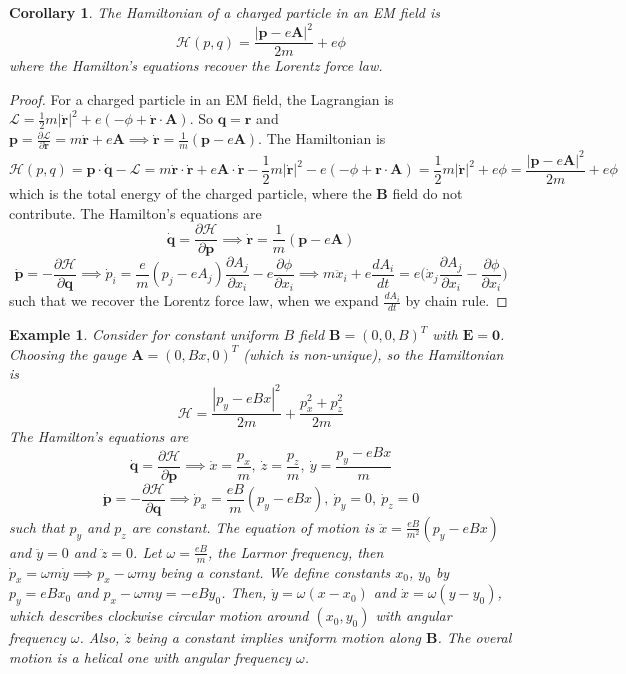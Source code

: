 \documentclass[a4paper]{article}
\newtheorem{eg}{Example}[section]
\theoremstyle{new}
\newtheorem{cor}{Corollary}[section]
\begin{document}
\begin{cor}
The Hamiltonian of a charged particle in an EM field is
$$\mathcal{H}(p,q)=\frac{|\mathbf{p}-e\mathbf{A}|^2}{2m}+e\phi$$
where the Hamilton's equations recover the Lorentz force law.
\end{cor}
\begin{proof}
For a charged particle in an EM field, the Lagrangian is $\mathcal{L}=\frac{1}{2}m|\mathbf{\dot{r}}|^2+e(-\phi+\mathbf{\dot{r}}\cdot\mathbf{A})$. So $\mathbf{q}=\mathbf{r}$ and $\mathbf{p}=\frac{\partial\mathcal{L}}{\partial\mathbf{\dot{r}}}=m\mathbf{\dot{r}}+e\mathbf{A}\implies\mathbf{\dot{r}}=\frac{1}{m}(\mathbf{p}-e\mathbf{A})$. The Hamiltonian is
$$\mathcal{H}(p,q)=\mathbf{p}\cdot\mathbf{\dot{q}}-\mathcal{L}=m\mathbf{\dot{r}}\cdot\mathbf{\dot{r}}+e\mathbf{A}\cdot\mathbf{\dot{r}}-\frac{1}{2}m|\mathbf{\dot{r}}|^2-e(-\phi+\mathbf{r}\cdot\mathbf{A})=\frac{1}{2}m|\mathbf{\dot{r}}|^2+e\phi=\frac{|\mathbf{p}-e\mathbf{A}|^2}{2m}+e\phi$$
which is the total energy of the charged particle, where the $\mathbf{B}$ field do not contribute. The Hamilton's equations are
$$\mathbf{\dot{q}}=\frac{\partial\mathcal{H}}{\partial\mathbf{p}}\implies\mathbf{\dot{r}}=\frac{1}{m}(\mathbf{p}-e\mathbf{A})$$
$$\mathbf{\dot{p}}=-\frac{\partial\mathcal{H}}{\partial\mathbf{q}}\implies\dot{p}_i=\frac{e}{m}(p_j-eA_j)\frac{\partial A_j}{\partial x_i}-e\frac{\partial\phi}{\partial x_i}\implies m\ddot{x}_i+e\frac{dA_i}{dt}=e\bigg(\dot{x}_j\frac{\partial A_j}{\partial x_i}-\frac{\partial\phi}{\partial x_i}\bigg)$$
such that we recover the Lorentz force law, when we expand $\frac{dA_i}{dt}$ by chain rule.
\end{proof}
\begin{eg}
Consider for constant uniform $B$ field $\mathbf{B}=(0,0,B)^T$ with $\mathbf{E}=\boldsymbol{0}$. Choosing the gauge $\mathbf{A}=(0,Bx,0)^T$ (which is non-unique), so the Hamiltonian is
$$\mathcal{H}=\frac{|p_y-eBx|^2}{2m}+\frac{p_x^2+p_z^2}{2m}$$
The Hamilton's equations are
$$\mathbf{\dot{q}}=\frac{\partial\mathcal{H}}{\partial\mathbf{p}}\implies\dot{x}=\frac{p_x}{m},~\dot{z}=\frac{p_z}{m},~\dot{y}=\frac{p_y-eBx}{m}$$
$$\mathbf{\dot{p}}=-\frac{\partial\mathcal{H}}{\partial\mathbf{q}}\implies\dot{p}_x=\frac{eB}{m}(p_y-eBx),~\dot{p}_y=0,~\dot{p}_z=0$$
such that $p_y$ and $p_z$ are constant. The equation of motion is $\ddot{x}=\frac{eB}{m^2}(p_y-eBx)$ and $\ddot{y}=0$ and $\ddot{z}=0$. Let $\omega=\frac{eB}{m}$, the Larmor frequency, then $\dot{p}_x=\omega m\dot{y}\implies p_x-\omega my$ being a constant. We define constants $x_0$, $y_0$ by $p_y=eBx_0$ and $p_x-\omega my=-eBy_0$. Then, $\dot{y}=\omega(x-x_0)$ and $\dot{x}=\omega(y-y_0)$, which describes clockwise circular motion around $(x_0,y_0)$ with angular frequency $\omega$. Also, $\dot{z}$ being a constant implies uniform motion along $\mathbf{B}$. The overal motion is a helical one with angular frequency $\omega$.
\end{eg}
\end{document}
